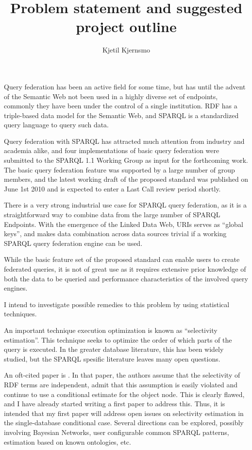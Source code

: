 \documentclass[a4paper,english,10pt]{article}
\title{Problem statement and suggested project outline}
\author{Kjetil Kjernsmo}
\begin{document}
\maketitle


Query federation has been an active field for some time, but has until
the advent of the Semantic Web not been used in a highly diverse set
of endpoints, commonly they have been under the control of a single
institution. RDF has a triple-based data model for the Semantic Web,
and SPARQL is a standardized query language to query such data.

Query federation with SPARQL has attracted much attention
from industry and academia alike, and four implementations of basic
query federation were submitted to the SPARQL 1.1 Working Group as
input for the forthcoming work. The basic query federation feature was
supported by a large number of group members, and the latest working
draft of the proposed standard was published on June 1st 2010 and is
expected to enter a Last Call review period shortly.

There is a very strong industrial use case for SPARQL query
federation, as it is a straightforward way to combine data from the
large number of SPARQL Endpoints. With the emergence of the Linked
Data Web, URIs serves as ``global keys'', and makes data combination
across data sources trivial if a working SPARQL query federation
engine can be used.

While the basic feature set of the proposed standard can enable users
to create federated queries, it is not of great use as it requires
extensive prior knowledge of both the data to be queried and
performance characteristics of the involved query engines. 

I intend to investigate possible remedies to this problem by using
statistical techniques. 

An important technique execution optimization is known as
``selectivity estimation''. This technique seeks to optimize the order
of which parts of the query is executed. In the greater database
literature, this has been widely studied, but the SPARQL spesific
literature leaves many open questions.

An oft-cited paper is \cite{Stocker:2008:SBG:1367497.1367578}. In that
paper, the authors assume that the selectivity of RDF terms are
independent, admit that this assumption is easily violated and
continue to use a conditional estimate for the object node. This is
clearly flawed, and I have already started writing a first paper to
address this. Thus, it is intended that my first paper will address
open issues on selectivity estimation in the single-database
conditional case.  Several directions can be explored, possibly
involving Bayesian Networks, user configurable common SPARQL patterns,
estimation based on known ontologies, etc.
\end{document}

